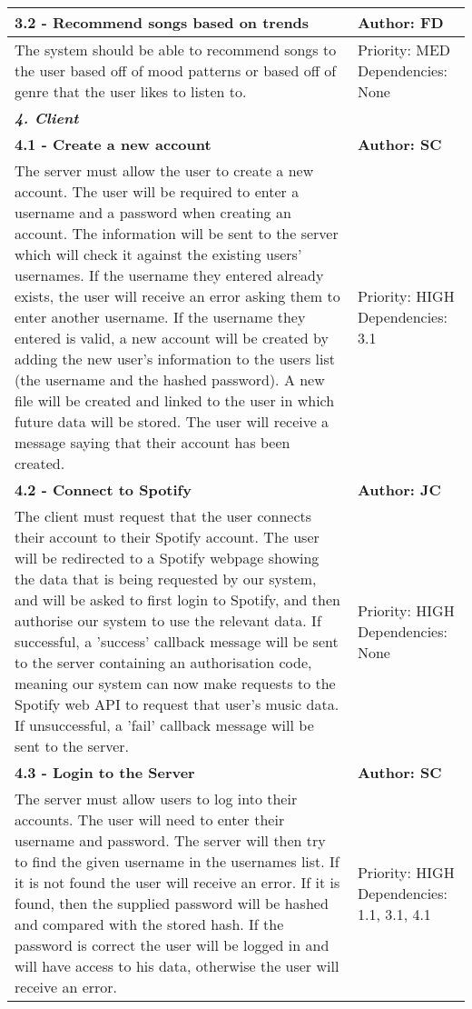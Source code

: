 \documentclass[12pt]{report}
\begin{document}
\begin{tabular}{| p{10cm} | p{3cm} |}
\hline
\textbf{3.2 - Recommend songs based on trends} & \textbf{Author: FD} \\
\hline
The system should be able to recommend songs to the user based off of mood patterns or based off of genre that the user likes to listen to. & Priority: MED Dependencies: None \\
\hline
\multicolumn{2}{|l|}{\textbf{\textit{4. Client}}} \\
\hline
\textbf{4.1 - Create a new account} & \textbf{Author: SC} \\
\hline
The server must allow the user to create a new account. The user will be required to enter a username and a password when creating an account. The information will be sent to the server which will check it against the existing users’ usernames. If the username they entered already exists, the user will receive an error asking them to enter another username. If the username they entered is valid, a new account will be created by adding the new user’s information to the users list (the username and the hashed password). A new file will be created and linked to the user in which future data will be stored. The user will receive a message saying that their account has been created. & Priority: HIGH Dependencies: 3.1 \\
\hline
\textbf{4.2 - Connect to Spotify} & \textbf{Author: JC} \\
\hline
The client must request that the user connects their account to their Spotify account. The user will be redirected to a Spotify webpage showing the data that is being requested by our system, and will be asked to first login to Spotify, and then authorise our system to use the relevant data. If successful, a 'success' callback message will be sent to the server containing an authorisation code, meaning our system can now make requests to the Spotify web API to request that user's music data. If unsuccessful, a 'fail' callback message will be sent to the server. & Priority: HIGH Dependencies: None \\
\hline
\textbf{4.3 - Login to the Server} & \textbf{Author: SC} \\
\hline
The server must allow users to log into their accounts. The user will need to enter their username and password. The server will then try to find the given username in the usernames list. If it is not found the user will receive an error. If it is found, then the supplied password will be hashed and compared with the stored hash. If the password is correct the user will be logged in and will have access to his data, otherwise the user will receive an error. &  Priority: HIGH Dependencies: 1.1, 3.1, 4.1 \\

\end{tabular}
\end{document}
